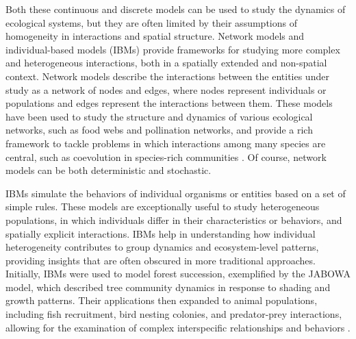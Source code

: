 Both these continuous and discrete models can be used to study the dynamics of
ecological systems, but they are often limited by their assumptions of
homogeneity in interactions and spatial structure. Network models and
individual-based models (IBMs) provide frameworks for studying more complex and
heterogeneous interactions, both in a spatially extended and non-spatial
context. Network models describe the interactions between the entities under
study as a network of nodes and edges, where nodes represent individuals or
populations and edges represent the interactions between them. These models
have been used to study the structure and dynamics of various ecological
networks, such as food webs and pollination networks, and provide a rich
framework to tackle problems in which interactions among many species are
central, such as coevolution in species-rich communities \cite{Bascompte2007}.
Of course, network models can be both deterministic and stochastic.

IBMs simulate the behaviors of individual organisms or entities based on a set
of simple rules. These models are exceptionally useful to study heterogeneous
populations, in which individuals differ in their characteristics or behaviors,
and spatially explicit interactions. IBMs help in understanding how individual
heterogeneity contributes to group dynamics and ecosystem-level patterns,
providing insights that are often obscured in more traditional approaches.
Initially, IBMs were used to model forest succession, exemplified by the JABOWA
model, which described tree community dynamics in response to shading and
growth patterns. Their applications then expanded to animal populations,
including fish recruitment, bird nesting colonies, and predator-prey
interactions, allowing for the examination of complex interspecific
relationships and behaviors \cite{deangelis2014}.


